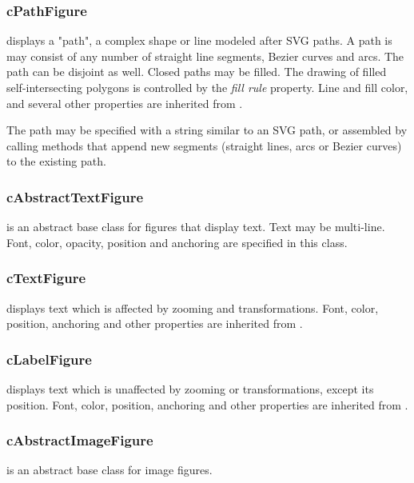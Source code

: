 \subsubsection{cPathFigure}

 displays a "path", a complex shape or line modeled after SVG
paths. A path is may consist of any number of straight line segments, Bezier
curves and arcs. The path can be disjoint as well. Closed paths may be filled.
The drawing of filled self-intersecting polygons is controlled by the
\textit{fill rule} property. Line and fill color, and several other properties
are inherited from .

The path may be specified with a string similar to an SVG path, or assembled
by calling methods that append new segments (straight lines, arcs or Bezier
curves) to the existing path.

\subsubsection{cAbstractTextFigure}

 is an abstract base class for figures that
display text. Text may be multi-line. Font, color, opacity, position and
anchoring are specified in this class.

\subsubsection{cTextFigure}

 displays text which is affected by zooming and
transformations. Font, color, position, anchoring and other properties are
inherited from .

\subsubsection{cLabelFigure}

 displays text which is unaffected by zooming or
transformations, except its position. Font, color, position, anchoring and
other properties are inherited from .

\subsubsection{cAbstractImageFigure}

 is an abstract base class for image figures.

